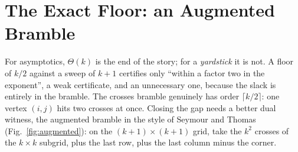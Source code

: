 \documentclass[sigplan,10pt,screen,review,anonymous]{acmart}
\begin{document}
\section{The Exact Floor: an Augmented Bramble}\label{sec:exact}

For asymptotics, $\Theta(k)$ is the end of the story; for a \emph{yardstick} it is not.
A floor of $k/2$ against a sweep of $k+1$ certifies only ``within a factor two in the
exponent'', a weak certificate, and an unnecessary one, because the slack is entirely in
the bramble. The crosses bramble genuinely has order $\lceil k/2\rceil$: one vertex
$(i,j)$ hits two crosses at once. Closing the gap needs a better dual witness, the
augmented bramble in the style of Seymour and Thomas~\cite{seymour1993graph}
(Fig.~\ref{fig:augmented}): on the $(k{+}1)\times(k{+}1)$ grid, take the $k^2$ crosses of
the $k\times k$ subgrid, plus the last row, plus the last column minus the corner.
\end{document}
